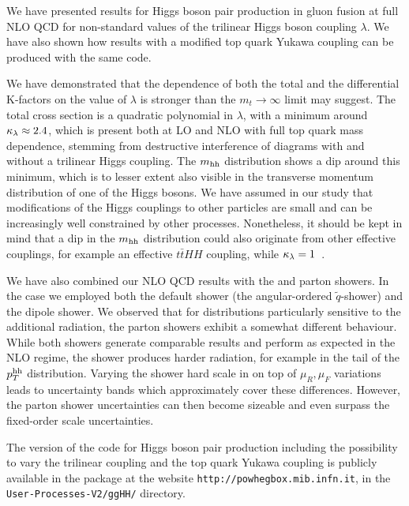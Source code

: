 We have presented results for Higgs boson pair production in gluon
fusion at full NLO QCD for non-standard values of the trilinear Higgs
boson coupling $\lambda$. We have also shown how results with a modified 
top quark Yukawa coupling can be produced with the same code.

We have demonstrated that the dependence of both the total and the
differential K-factors on the value of $\lambda$ is stronger than the $m_t\to\infty$ limit may suggest.
The total cross section is a quadratic
polynomial in $\lambda$, with a minimum around $\kappa_{\lambda}\approx 2.4$,
which is present both at LO and NLO with full top quark mass
dependence, stemming from destructive interference of diagrams with
and without a trilinear Higgs coupling. 
The $m_{\mathrm{hh}}$ distribution shows a dip around this minimum, which is to
lesser extent also visible in the transverse momentum distribution of
one of the Higgs bosons. 
We have assumed in our study that modifications of the Higgs couplings
to other particles are small and can be increasingly well constrained by
other processes. Nonetheless, it should be kept in mind that a dip in
the $m_{\mathrm{hh}}$ distribution could also originate from other effective
couplings, for example an effective $t\bar{t}HH$ coupling, while
$\kappa_{\lambda}= 1$~\cite{Buchalla:2018yce}.

We have also combined our NLO QCD results with the \pythia and \herwig
parton showers. In the \herwig case we employed both the default 
shower (the angular-ordered $\tilde{q}$-shower) and the dipole shower.
We observed that for distributions particularly sensitive to the 
additional radiation, the parton showers exhibit a somewhat different 
behaviour. While both \herwig showers generate comparable results and 
perform as expected in the NLO regime, the \pythia shower produces harder 
radiation, for example in the tail of the $p_T^{\mathrm{hh}}$
distribution. Varying the shower hard scale in \herwig on top of
$\mu_R,\mu_F$ variations leads to
uncertainty bands which approximately cover these 
differences. However, the parton shower uncertainties 
can then become sizeable and even surpass the fixed-order scale uncertainties.

The \powheg{} version of the code for Higgs boson pair production
including the possibility to vary the trilinear coupling 
and the top quark Yukawa coupling 
is publicly available in the  package at the website
{\tt http://powhegbox.mib.infn.it}, in the
{\tt User-Processes-V2/ggHH/} directory.
